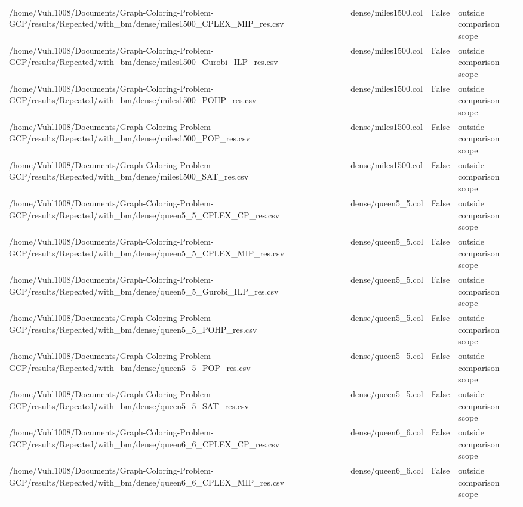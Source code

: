 \begin{table}[htbp]
\begin{tabular}{llll}
/home/Vuhl1008/Documents/Graph-Coloring-Problem-GCP/results/Repeated/with\_bm/dense/miles1500\_CPLEX\_MIP\_res.csv & dense/miles1500.col & False & outside comparison scope \\
/home/Vuhl1008/Documents/Graph-Coloring-Problem-GCP/results/Repeated/with\_bm/dense/miles1500\_Gurobi\_ILP\_res.csv & dense/miles1500.col & False & outside comparison scope \\
/home/Vuhl1008/Documents/Graph-Coloring-Problem-GCP/results/Repeated/with\_bm/dense/miles1500\_POHP\_res.csv & dense/miles1500.col & False & outside comparison scope \\
/home/Vuhl1008/Documents/Graph-Coloring-Problem-GCP/results/Repeated/with\_bm/dense/miles1500\_POP\_res.csv & dense/miles1500.col & False & outside comparison scope \\
/home/Vuhl1008/Documents/Graph-Coloring-Problem-GCP/results/Repeated/with\_bm/dense/miles1500\_SAT\_res.csv & dense/miles1500.col & False & outside comparison scope \\
/home/Vuhl1008/Documents/Graph-Coloring-Problem-GCP/results/Repeated/with\_bm/dense/queen5\_5\_CPLEX\_CP\_res.csv & dense/queen5\_5.col & False & outside comparison scope \\
/home/Vuhl1008/Documents/Graph-Coloring-Problem-GCP/results/Repeated/with\_bm/dense/queen5\_5\_CPLEX\_MIP\_res.csv & dense/queen5\_5.col & False & outside comparison scope \\
/home/Vuhl1008/Documents/Graph-Coloring-Problem-GCP/results/Repeated/with\_bm/dense/queen5\_5\_Gurobi\_ILP\_res.csv & dense/queen5\_5.col & False & outside comparison scope \\
/home/Vuhl1008/Documents/Graph-Coloring-Problem-GCP/results/Repeated/with\_bm/dense/queen5\_5\_POHP\_res.csv & dense/queen5\_5.col & False & outside comparison scope \\
/home/Vuhl1008/Documents/Graph-Coloring-Problem-GCP/results/Repeated/with\_bm/dense/queen5\_5\_POP\_res.csv & dense/queen5\_5.col & False & outside comparison scope \\
/home/Vuhl1008/Documents/Graph-Coloring-Problem-GCP/results/Repeated/with\_bm/dense/queen5\_5\_SAT\_res.csv & dense/queen5\_5.col & False & outside comparison scope \\
/home/Vuhl1008/Documents/Graph-Coloring-Problem-GCP/results/Repeated/with\_bm/dense/queen6\_6\_CPLEX\_CP\_res.csv & dense/queen6\_6.col & False & outside comparison scope \\
/home/Vuhl1008/Documents/Graph-Coloring-Problem-GCP/results/Repeated/with\_bm/dense/queen6\_6\_CPLEX\_MIP\_res.csv & dense/queen6\_6.col & False & outside comparison scope \\

\end{tabular}
\end{table}

